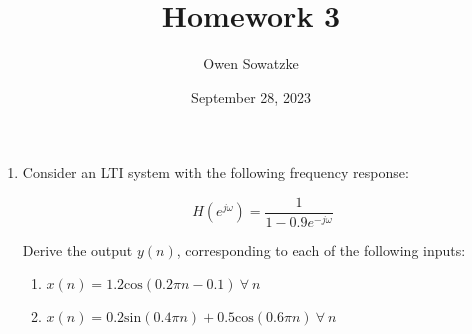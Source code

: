 \documentclass[fleqn]{article}
\title{Homework 3}
\author{Owen Sowatzke}
\date{September 28, 2023}
\makeatletter
\newcommand{\zerodisplayskip}{
	\setlength{\abovedisplayskip}{0pt}
	\setlength{\belowdisplayskip}{0pt}
	\setlength{\abovedisplayshortskip}{0pt}
	\setlength{\belowdisplayshortskip}{0pt}
	\setlength{\mathindent}{0pt}}
\newenvironment{equationCenter}{\@fleqnfalse\begin{equation*}}{\end{equation*}}
\makeatother
\begin{document}
	\zerodisplayskip
	\doublespacing
	\maketitle
	
	\begin{enumerate}[nolistsep]
		\item Consider an LTI system with the following frequency response:
		
		\begin{equationCenter}
			H(e^{j\omega}) = \frac{1}{1 - 0.9e^{-j\omega}}
		\end{equationCenter}
		
		Derive the output $y(n)$, corresponding to each of the following inputs:
		
		\begin{enumerate}[nolistsep]	
			\item $x(n) = 1.2\text{cos}(0.2\pi n - 0.1)\ \forall\ n$
			
			\item $x(n) = 0.2\text{sin}(0.4\pi n) + 0.5\text{cos}(0.6\pi n)\ \forall\ n$
		\end{enumerate}
	\end{enumerate}
\end{document}
